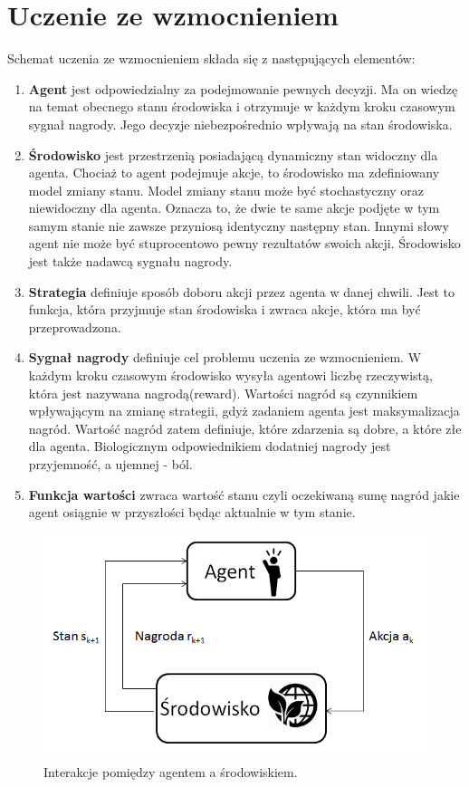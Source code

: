 \documentclass[12pt]{book}
\theoremstyle{plain}
\begin{document}
\section{Uczenie ze wzmocnieniem}
Schemat uczenia ze wzmocnieniem składa się z następujących elementów:
\begin{enumerate}
	\item \textbf{Agent} jest odpowiedzialny za podejmowanie pewnych decyzji. Ma on wiedzę na temat obecnego stanu środowiska i otrzymuje w każdym kroku czasowym sygnał nagrody. Jego decyzje niebezpośrednio wpływają na stan środowiska.
	\item \textbf{Środowisko} jest przestrzenią posiadającą dynamiczny stan widoczny dla agenta. Chociaż to agent podejmuje akcje, to środowisko ma zdefiniowany model zmiany stanu. Model zmiany stanu może być stochastyczny oraz niewidoczny dla agenta. Oznacza to, że dwie te same akcje podjęte w tym samym stanie nie zawsze przyniosą identyczny następny stan. Innymi słowy agent nie może być stuprocentowo pewny rezultatów swoich akcji. Środowisko jest także nadawcą sygnału nagrody.
	\item \textbf{Strategia} definiuje sposób doboru akcji przez agenta w danej chwili. Jest to funkcja, która przyjmuje stan środowiska i zwraca akcje, która ma być przeprowadzona. 
	\item \textbf{Sygnał nagrody} definiuje cel problemu uczenia ze wzmocnieniem. W każdym kroku czasowym środowisko wysyła agentowi liczbę rzeczywistą, która jest nazywana nagrodą(reward). Wartości nagród są czynnikiem wpływającym na zmianę strategii, gdyż zadaniem agenta jest maksymalizacja nagród. Wartość nagród zatem definiuje, które zdarzenia są dobre, a które złe dla agenta. Biologicznym odpowiednikiem dodatniej nagrody jest przyjemność, a ujemnej - ból. 
	\item \textbf{Funkcja wartości} zwraca wartość stanu czyli oczekiwaną sumę nagród jakie agent osiągnie w przyszłości będąc aktualnie w tym stanie. 
\end{enumerate}
\begin{figure}[H]
	\centering
	\includegraphics[width=14cm]{agent-srodowisko}
	\caption{Interakcje pomiędzy agentem a środowiskiem.}
	\label{fig:agent-srodowisko}
\end{figure}
\end{document}
